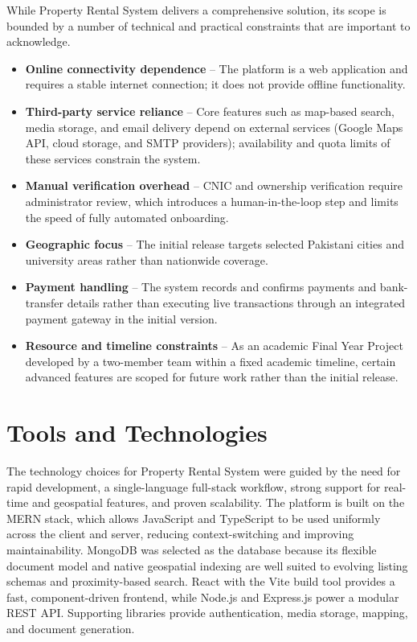 While Property Rental System delivers a comprehensive solution, its scope is bounded by a number of technical and practical constraints that are important to acknowledge.

\begin{itemize}
    \item \textbf{Online connectivity dependence} -- The platform is a web application and requires a stable internet connection; it does not provide offline functionality.
    \item \textbf{Third-party service reliance} -- Core features such as map-based search, media storage, and email delivery depend on external services (Google Maps API, cloud storage, and SMTP providers); availability and quota limits of these services constrain the system.
    \item \textbf{Manual verification overhead} -- CNIC and ownership verification require administrator review, which introduces a human-in-the-loop step and limits the speed of fully automated onboarding.
    \item \textbf{Geographic focus} -- The initial release targets selected Pakistani cities and university areas rather than nationwide coverage.
    \item \textbf{Payment handling} -- The system records and confirms payments and bank-transfer details rather than executing live transactions through an integrated payment gateway in the initial version.
    \item \textbf{Resource and timeline constraints} -- As an academic Final Year Project developed by a two-member team within a fixed academic timeline, certain advanced features are scoped for future work rather than the initial release.
\end{itemize}


\section{Tools and Technologies}

The technology choices for Property Rental System were guided by the need for rapid development, a single-language full-stack workflow, strong support for real-time and geospatial features, and proven scalability. The platform is built on the MERN stack, which allows JavaScript and TypeScript to be used uniformly across the client and server, reducing context-switching and improving maintainability. MongoDB was selected as the database because its flexible document model and native geospatial indexing are well suited to evolving listing schemas and proximity-based search. React with the Vite build tool provides a fast, component-driven frontend, while Node.js and Express.js power a modular REST API. Supporting libraries provide authentication, media storage, mapping, and document generation.

